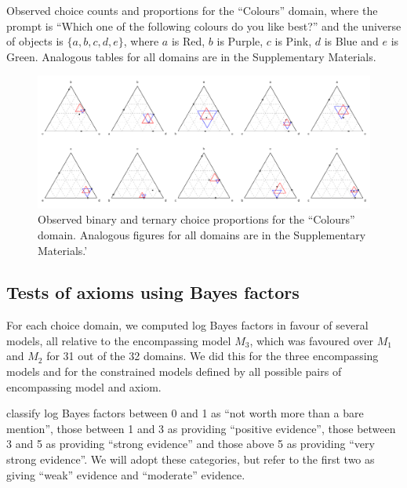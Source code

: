 \documentclass[11pt,letter]{article}
\begin{document}
\begin{table}
  
  \caption{Observed choice counts and proportions for the ``Colours'' domain, where the prompt is ``Which one of the following colours do you like best?'' and the universe of objects is $\{a,b,c,d,e\}$, where $a$ is Red, $b$ is Purple, $c$ is Pink, $d$ is Blue and $e$ is Green. Analogous tables for all domains are in the Supplementary Materials.}
  \label{t:colours_table}
\end{table}

\begin{figure}
	\caption{Observed binary and ternary choice proportions for the ``Colours'' domain. Analogous figures for all domains are in the Supplementary Materials.'}\label{f:colours_figure}
	\centering
	\includegraphics[width=16cm]{colours_figure.pdf}
\end{figure}

\subsection{Tests of axioms using Bayes factors}

For each choice domain, we computed log Bayes factors in favour of several models, all relative to the encompassing model $M_3$, which was favoured over $M_1$ and $M_2$ for 31 out of the 32 domains.
We did this for the three encompassing models and for the constrained models defined by all possible pairs of encompassing model and axiom.

 classify log Bayes factors between 0 and 1 as ``not worth more than a bare mention'', those between 1 and 3 as providing ``positive evidence'', those between 3 and 5 as providing ``strong evidence'' and those above 5 as providing ``very strong evidence''. We will adopt these categories, but refer to the first two as giving ``weak'' evidence and ``moderate'' evidence.
\end{document}
